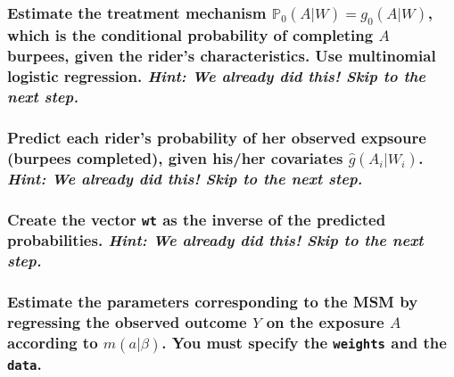 \documentclass{article}\usepackage[]{graphicx}\usepackage[]{xcolor}
\begin{document}
    \subsubsection{Estimate the treatment mechanism $\mathbb{P}_0(A|W)=g_0(A|W)$, which is the conditional probability of completing $A$ burpees, given the rider's characteristics. Use multinomial logistic regression.
    \textit{Hint: We already did this! Skip to the next step.}}
    
    \subsubsection{Predict each rider's probability of her observed expsoure (burpees completed), given his/her covariates $\hat{g}(A_i|W_i)$. 
    \textit{Hint: We already did this! Skip to the next step.}}
    
    \subsubsection{Create the vector \texttt{wt} as the inverse of the predicted probabilities. 
    \textit{Hint: We already did this! Skip to the next step.}}
        
    \subsubsection{Estimate the parameters corresponding to the MSM by regressing the observed outcome $Y$ on the exposure $A$ according to $m(a|\beta)$. You must specify the \texttt{weights} and the \texttt{data}.}
    
\end{document}
